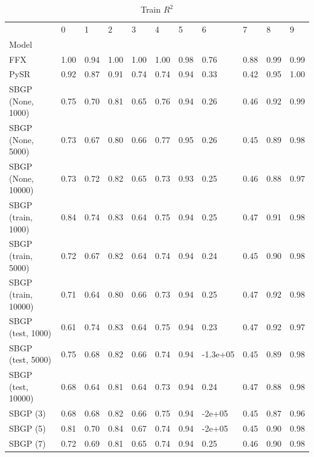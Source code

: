 \begin{table}
\caption{Train $R^2$}
\label{tab:Rsq_train}
\begin{tabular}{lllllllllll}
\toprule
 & 0 & 1 & 2 & 3 & 4 & 5 & 6 & 7 & 8 & 9 \\
Model &  &  &  &  &  &  &  &  &  &  \\
\midrule
FFX & 1.00 & 0.94 & 1.00 & 1.00 & 1.00 & 0.98 & 0.76 & 0.88 & 0.99 & 0.99 \\
PySR & 0.92 & 0.87 & 0.91 & 0.74 & 0.74 & 0.94 & 0.33 & 0.42 & 0.95 & 1.00 \\
SBGP (None, 1000) & 0.75 & 0.70 & 0.81 & 0.65 & 0.76 & 0.94 & 0.26 & 0.46 & 0.92 & 0.99 \\
SBGP (None, 5000) & 0.73 & 0.67 & 0.80 & 0.66 & 0.77 & 0.95 & 0.26 & 0.45 & 0.89 & 0.98 \\
SBGP (None, 10000) & 0.73 & 0.72 & 0.82 & 0.65 & 0.73 & 0.93 & 0.25 & 0.46 & 0.88 & 0.97 \\
SBGP (train, 1000) & 0.84 & 0.74 & 0.83 & 0.64 & 0.75 & 0.94 & 0.25 & 0.47 & 0.91 & 0.98 \\
SBGP (train, 5000) & 0.72 & 0.67 & 0.82 & 0.64 & 0.74 & 0.94 & 0.24 & 0.45 & 0.90 & 0.98 \\
SBGP (train, 10000) & 0.71 & 0.64 & 0.80 & 0.66 & 0.73 & 0.94 & 0.25 & 0.47 & 0.92 & 0.98 \\
SBGP (test, 1000) & 0.61 & 0.74 & 0.83 & 0.64 & 0.75 & 0.94 & 0.23 & 0.47 & 0.92 & 0.97 \\
SBGP (test, 5000) & 0.75 & 0.68 & 0.82 & 0.66 & 0.74 & 0.94 & -1.3e+05 & 0.45 & 0.89 & 0.98 \\
SBGP (test, 10000) & 0.68 & 0.64 & 0.81 & 0.64 & 0.73 & 0.94 & 0.24 & 0.47 & 0.88 & 0.98 \\
SBGP (3) & 0.68 & 0.68 & 0.82 & 0.66 & 0.75 & 0.94 & -2e+05 & 0.45 & 0.87 & 0.96 \\
SBGP (5) & 0.81 & 0.70 & 0.84 & 0.67 & 0.74 & 0.94 & -2e+05 & 0.45 & 0.90 & 0.98 \\
SBGP (7) & 0.72 & 0.69 & 0.81 & 0.65 & 0.74 & 0.94 & 0.25 & 0.46 & 0.90 & 0.98 \\
\bottomrule
\end{tabular}
\end{table}
